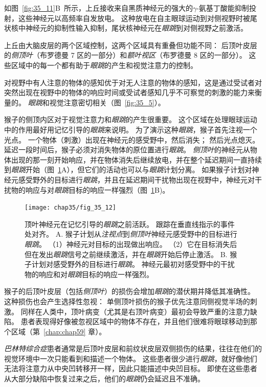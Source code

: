 如图~\ref{fig:35_11}B~所示，上丘接收来自黑质神经元的强大的$\gamma$-氨基丁酸能抑制投射，这些神经元以高频率自发放电。
这种放电在自主眼球运动到对侧视野时被尾状核中神经元的抑制性输入抑制，尾状核神经元在\textit{眼跳}到对侧视野之前激活。


上丘由大脑皮层的两个区域控制，这两个区域具有重叠但功能不同：
后顶叶皮层的\textit{侧顶叶}（布罗德曼 7 区的一部分）和\textit{额叶视区}（布罗德曼 8 区的一部分）。 
这些区域中的每一个都有助于\textit{眼跳}的产生和视觉注意力的控制。


对视野中有人注意的物体的感知优于对无人注意的物体的感知，这是通过受试者对突然出现在视野中的物体的响应时间或受试者感知几乎不可察觉的刺激的能力来衡量的。
\textit{眼跳}和视觉注意密切相关（图~\ref{fig:35_5}）。


猴子的侧顶内区对于视觉注意力和\textit{眼跳}的产生很重要。
这个区域在处理眼球运动中的作用最好用记忆引导的\textit{眼跳}来说明。
为了演示这种\textit{眼跳}，猴子首先注视一个光点。
一个物体（刺激）出现在神经元的感受野中，然后消失；
然后光点熄灭。
延迟一段时间后，猴子必须对消失物体的原位置进行\textit{眼跳}。
\textit{侧顶叶}的神经元从物体出现的那一刻开始响应，并在物体消失后继续放电，并在整个延迟期间一直持续到\textit{眼跳}开始（图~\ref{fig:35_12}A），但它们的活动也可以与\textit{眼跳}计划分离。
如果猴子计划对神经元感受野外的目标进行\textit{眼跳}，并且在延迟期间干扰物出现在视野中，神经元对干扰物的响应与对\textit{眼跳}目标的响应一样强烈（图~\ref{fig:35_12}B)。


\begin{figure}[htbp]
	\centering
	\texttt{[image: chap35/fig\_35\_12]}
	\caption{顶叶神经元在记忆引导的\textit{眼跳}之前活跃。
		跟踪在垂直线指示的事件处对齐\cite{powell2000response}。
		A. 猴子计划从\textit{注视点}到\textit{侧顶叶}神经元感受野中的目标进行\textit{眼跳}。
		（1）神经元对目标的出现做出响应。
		（2）它在目标消失后但在发出\textit{眼跳}信号之前继续激活，并在\textit{眼跳}开始后停止激活。
		B. 猴子计划对感受野外的目标进行\textit{眼跳}。
		神经元最初对感受野中的干扰物的响应和对\textit{眼跳}目标的响应一样强烈。}
	\label{fig:35_12}
\end{figure}



猴子的后顶叶皮层（包括\textit{侧顶叶}）的损伤会增加\textit{眼跳}的潜伏期并降低其准确性。
这种损伤也会产生选择性忽视：
单侧顶叶损伤的猴子优先注意同侧视觉半场的刺激。
同样在人类中，顶叶病变（尤其是右顶叶病变）最初会导致严重的注意力缺陷。
患者表现得好像被忽视区域中的物体不存在，并且他们很难将眼球移动到那个区域（第~\ref{chap:chap59} 章）。


\textit{巴林特综合症}患者通常是后顶叶皮层和前纹状皮层双侧损伤的结果，往往在他们的视觉环境中一次只能看到和描述一个物体。
这些患者很少进行\textit{眼跳}，就好像他们无法将注意力从中央凹转移开一样，因此只能描述中央凹目标。
即使在这些患者从大部分缺陷中恢复过来之后，他们的\textit{眼跳}仍会延迟且不准确。


